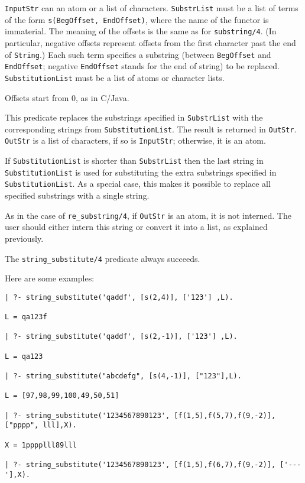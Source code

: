 \begin{description}


{\tt InputStr} can an atom or a list of characters.  {\tt SubstrList} must
be a list of terms of the form {\tt s(BegOffset, EndOffset)}, where the
name of the functor is immaterial.  The meaning of the offsets is the same
as for {\tt substring/4}. (In particular, negative offsets represent
offsets from the first character past the end of {\tt String}.)  Each such
term specifies a substring (between {\tt BegOffset} and {\tt EndOffset};
negative {\tt EndOffset} stands for the end of string) to be replaced.
{\tt SubstitutionList} must be a list of atoms or character lists.

Offsets start from 0, as in C/Java.

This predicate replaces the substrings specified in {\tt SubstrList} with
the corresponding strings from {\tt SubstitutionList}.  The result is
returned in {\tt OutStr}. {\tt OutStr} is a list of characters, if so is
{\tt InputStr}; otherwise, it is an atom.

If {\tt SubstitutionList} is shorter than {\tt SubstrList} then the last
string in {\tt SubstitutionList} is used for substituting the extra
substrings specified in {\tt SubstitutionList}. As a special case, this
makes it possible to replace all specified substrings with a single string.

As in the case of {\tt re\_substring/4}, if {\tt OutStr} is an atom, it is
not interned.  The user should either intern this string or convert it into
a list, as explained previously.

The \verb|string_substitute/4| predicate always succeeds.

Here are some examples:
\begin{verbatim}
| ?- string_substitute('qaddf', [s(2,4)], ['123'] ,L).

L = qa123f

| ?- string_substitute('qaddf', [s(2,-1)], ['123'] ,L).

L = qa123

| ?- string_substitute("abcdefg", [s(4,-1)], ["123"],L).

L = [97,98,99,100,49,50,51]

| ?- string_substitute('1234567890123', [f(1,5),f(5,7),f(9,-2)], ["pppp", lll],X).

X = 1pppplll89lll

| ?- string_substitute('1234567890123', [f(1,5),f(6,7),f(9,-2)], ['---'],X).


\end{verbatim}
\end{description}

